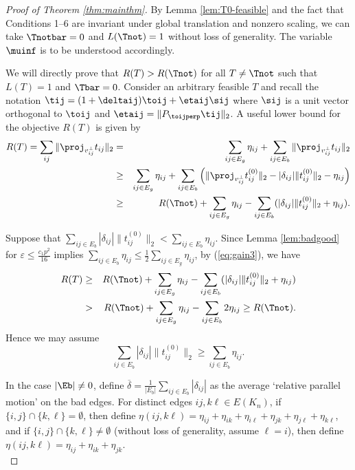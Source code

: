 \begin{proof}[Proof of Theorem \ref{thm:mainthm}]

By Lemma \ref{lem:T0-feasible} and the fact that Conditions 1--6 are invariant under global translation and nonzero scaling, we can take $\Tnotbar=0$ and $L(\Tnot) = 1$ without loss of generality.  The variable $\muinf$ is to be understood accordingly.  


We will directly prove that $R(T) > R(\Tnot)$ for all $T\neq \Tnot$ such that $L(T)=1$ and $\Tbar = 0$. Consider an arbitrary feasible $T$ and recall the notation $\tij = (1 + \deltaij) \toij + \etaij \sij$ where $\sij$ is a unit vector orthogonal to $\toij$ and $\etaij = \| P_{\toijperp} \tij \|_2$. A useful lower bound for the objective $R(T)$ is given by 
\begin{eqnarray}
	R(T)
	=\sum_{ij}\|\proj_{v_{ij}^{\perp}}t_{ij}\| _2
	& = & \sum_{ij\in E_{g}}\eta_{ij}+\sum_{ij\in E_{b}}\|\proj_{v_{ij}^{\perp}}t_{ij}\|_2\nonumber \\
	& \ge & \sum_{ij\in E_{g}}\eta_{ij}+\sum_{ij\in E_{b}}\left(\|\proj_{v_{ij}^{\perp}}t_{ij}^{(0)}\|_2-|\delta_{ij}|\|t_{ij}^{(0)}\|_2-\eta_{ij}\right)\nonumber \\
	& \ge & R(\Tnot)+\sum_{ij\in E_{g}}\eta_{ij}-\sum_{ij\in E_{b}}(|\delta_{ij}|\|t_{ij}^{(0)}\|_2+\eta_{ij}).\label{eq:gain3}
\end{eqnarray}


Suppose that $\sum_{ij\in E_{b}}|\delta_{ij}|\|t_{ij}^{(0)}\|_2<\sum_{ij\in E_{b}}\eta_{ij}$.
Since Lemma \ref{lem:badgood} for $\varepsilon\le\frac{c_{1}p^2}{16}$
implies $\sum_{ij\in E_{b}}\eta_{ij}\le\frac{1}{2}\sum_{ij\in E_{g}}\eta_{ij}$,
by (\ref{eq:gain3}), we have
\begin{eqnarray*}
	R(T) & \ge & R(\Tnot)+\sum_{ij\in E_{g}}\eta_{ij}-\sum_{ij\in E_{b}}(|\delta_{ij}|\|t_{ij}^{(0)}\|_2+\eta_{ij})\\
	& > & R(\Tnot)+\sum_{ij\in E_{g}}\eta_{ij}-\sum_{ij\in E_{b}}2\eta_{ij}\ge R(\Tnot).
\end{eqnarray*}
Hence we may assume 
\begin{equation}
	\sum_{ij\in E_{b}}|\delta_{ij}|\|t_{ij}^{(0)}\|_2\ge\sum_{ij\in E_{b}}\eta_{ij}.\label{eq:badtwist}
\end{equation}

In the case $|\Eb| \neq 0$, define $\overline{\delta}=\frac{1}{|E_{b}|}\sum_{ij\in E_{b}}|\delta_{ij}|$
as the average `relative parallel motion' on the bad edges. For distinct edges $ij,k\ell\in E(K_{n})$,
if $\{i,j\}\cap\{k,\ell\} = \emptyset$, then define $\eta(ij,k\ell)=\eta_{ij}+\eta_{ik}+\eta_{i\ell}+\eta_{jk}+\eta_{j\ell}+\eta_{k\ell}$,
and if $\{i,j\}\cap\{k,\ell\}\neq\emptyset$ (without loss of generality,
assume $\ell=i$), then define $\eta(ij,k\ell)=\eta_{ij}+\eta_{ik}+\eta_{jk}$. \\


\end{proof}
